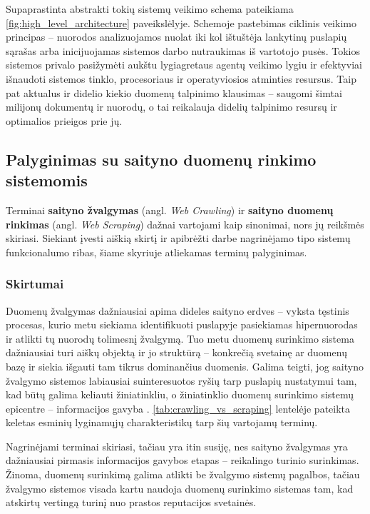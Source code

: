 Supaprastinta abstrakti tokių sistemų veikimo schema pateikiama \ref{fig:high_level_architecture} paveikslėlyje. Schemoje pastebimas ciklinis veikimo principas -- nuorodos analizuojamos nuolat iki kol ištuštėja lankytinų puslapių sąrašas arba inicijuojamas sistemos darbo nutraukimas iš vartotojo pusės. Tokios sistemos privalo pasižymėti aukštu lygiagretaus agentų veikimo lygiu ir efektyviai išnaudoti sistemos tinklo, procesoriaus ir operatyviosios atminties resursus. Taip pat aktualus ir didelio kiekio duomenų talpinimo klausimas -- saugomi šimtai milijonų dokumentų ir nuorodų, o tai reikalauja didelių talpinimo resursų ir optimalios prieigos prie jų.




\subsection{Palyginimas su saityno duomenų rinkimo sistemomis}
Terminai \textbf{saityno žvalgymas} (angl. \textit{Web Crawling}) ir \textbf{saityno duomenų rinkimas} (angl. \textit{Web Scraping}) dažnai vartojami kaip sinonimai, nors jų reikšmės skiriasi. Siekiant įvesti aiškią skirtį ir apibrėžti darbe nagrinėjamo tipo sistemų funkcionalumo ribas, šiame skyriuje atliekamas terminų palyginimas. 

\subsubsection{Skirtumai}

Duomenų žvalgymas dažniausiai apima dideles saityno erdves -- vyksta tęstinis procesas, kurio metu siekiama identifikuoti puslapyje pasiekiamas hipernuorodas ir atlikti tų nuorodų tolimesnį žvalgymą. Tuo metu duomenų surinkimo sistema dažniausiai turi aiškų objektą ir jo struktūrą -- konkrečią svetainę ar duomenų bazę ir siekia išgauti tam tikrus dominančius duomenis. Galima teigti, jog saityno žvalgymo sistemos labiausiai suinteresuotos ryšių tarp puslapių nustatymui tam, kad būtų galima keliauti žiniatinkliu, o žiniatinklio duomenų surinkimo sistemų epicentre -- informacijos gavyba \cite{OxylabsScrapingVsCrawling}. \ref{tab:crawling_vs_scraping} lentelėje pateikta keletas esminių lyginamųjų charakteristikų tarp šių vartojamų terminų.

Nagrinėjami terminai skiriasi, tačiau yra itin susiję, nes saityno žvalgymas yra dažniausiai pirmasis informacijos gavybos etapas -- reikalingo turinio surinkimas. Žinoma, duomenų surinkimą galima atlikti be žvalgymo sistemų pagalbos, tačiau žvalgymo sistemos visada kartu naudoja duomenų surinkimo sistemas tam, kad atskirtų vertingą turinį nuo prastos reputacijos svetainės. \cite{OxylabsScrapingVsCrawling}

